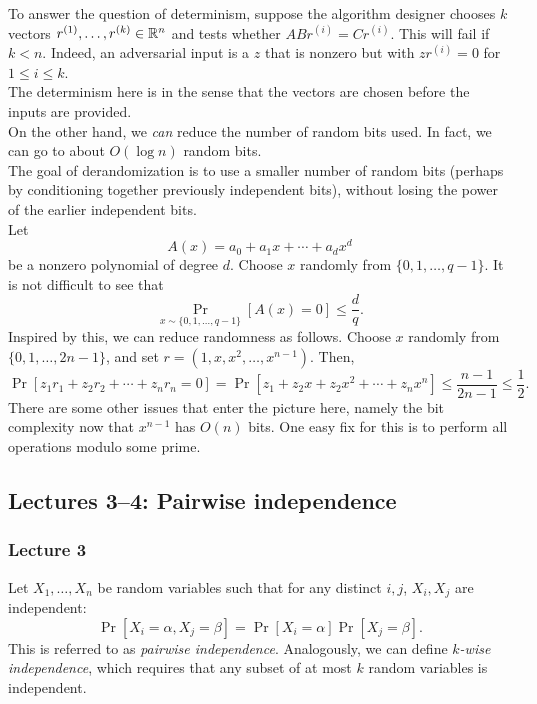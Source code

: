 		To answer the question of determinism, suppose the algorithm designer chooses $k$ vectors $r^{(1)},\ldots,r^{(k)} \in \mathbb{R}^n$ and tests whether $ABr^{(i)} = Cr^{(i)}$. This will fail if $k < n$. Indeed, an adversarial input is a $z$ that is nonzero but with $zr^{(i)} = 0$ for $1 \le i \le k$.\\
		The determinism here is in the sense that the vectors are chosen before the inputs are provided.\\

		On the other hand, we \emph{can} reduce the number of random bits used. In fact, we can go to about $O(\log n)$ random bits.\\
		The goal of derandomization is to use a smaller number of random bits (perhaps by conditioning together previously independent bits), without losing the power of the earlier independent bits.\\
		Let
		\[ A(x) = a_0 + a_1x + \cdots + a_{d}x^{d} \]
		be a nonzero polynomial of degree $d$. Choose $x$ randomly from $\{0,1,\ldots,q-1\}$. It is not difficult to see that
		\[ \Pr_{x \sim \{0,1,\ldots,q-1\}}\left[ A(x) = 0 \right] \le \frac{d}{q}. \]
		Inspired by this, we can reduce randomness as follows. Choose $x$ randomly from $\{0,1,\ldots,2n-1\}$, and set $r = (1,x,x^2,\ldots,x^{n-1})$. Then,
		\[ \Pr[ z_1r_1 + z_2r_2 + \cdots + z_nr_n = 0 ] = \Pr\left[ z_1 + z_2x + z_2x^2 + \cdots + z_nx^n \right] \le \frac{n-1}{2n-1} \le \frac{1}{2}. \]
		There are some other issues that enter the picture here, namely the bit complexity now that $x^{n-1}$ has $O(n)$ bits. One easy fix for this is to perform all operations modulo some prime.



	\subsection{Lectures 3--4: Pairwise independence}

		\subsubsection{Lecture 3}

			Let $X_1,\ldots,X_n$ be random variables such that for any distinct $i,j$, $X_i,X_j$ are independent:
			\[ \Pr[X_i = \alpha, X_j = \beta] = \Pr[X_i = \alpha] \Pr[X_j = \beta]. \]
			This is referred to as \emph{pairwise independence}. Analogously, we can define \emph{$k$-wise independence}, which requires that any subset of at most $k$ random variables is independent.

